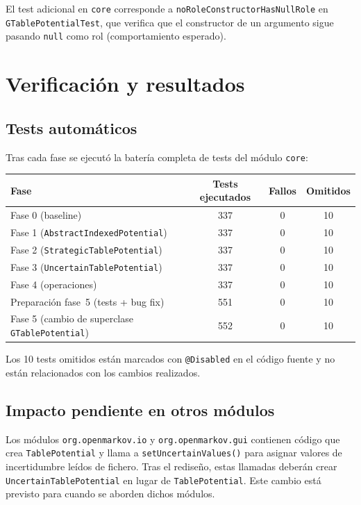 \documentclass[11pt,a4paper]{article}
\newcommand{\code}[1]{\texttt{#1}}
\begin{document}
El test adicional en \code{core} corresponde a
\code{no\-Role\-Constructor\-Has\-Null\-Role} en \code{GTable\-Potential\-Test},
que verifica que el constructor de un argumento sigue pasando \code{null} como
rol (comportamiento esperado).

\section{Verificación y resultados}
\label{sec:verificacion}

\subsection{Tests automáticos}

Tras cada fase se ejecutó la batería completa de tests del módulo \code{core}:

\begin{center}
\begin{tabular}{lccc}
\toprule
\textbf{Fase} & \textbf{Tests ejecutados} & \textbf{Fallos} & \textbf{Omitidos} \\
\midrule
Fase 0 (baseline) & 337 & 0 & 10 \\
Fase 1 (\code{AbstractIndexedPotential}) & 337 & 0 & 10 \\
Fase 2 (\code{StrategicTablePotential}) & 337 & 0 & 10 \\
Fase 3 (\code{UncertainTablePotential}) & 337 & 0 & 10 \\
Fase 4 (operaciones) & 337 & 0 & 10 \\
\midrule
Preparación fase~5 (tests + bug fix) & 551 & 0 & 10 \\
Fase 5 (cambio de superclase \code{GTablePotential}) & 552 & 0 & 10 \\
\bottomrule
\end{tabular}
\end{center}

Los 10 tests omitidos están marcados con \code{@Disabled} en el código fuente
y no están relacionados con los cambios realizados.

\subsection{Impacto pendiente en otros módulos}

Los módulos \code{org.\-openmarkov.\-io} y \code{org.\-openmarkov.\-gui}
contienen código que crea \code{Table\-Potential} y llama a
\code{set\-Uncertain\-Values()} para asignar valores de incertidumbre
leídos de fichero.  Tras el rediseño, estas llamadas deberán crear
\code{Uncertain\-Table\-Potential} en lugar de \code{TablePotential}.  Este cambio está previsto para cuando se aborden dichos
módulos.
\end{document}
